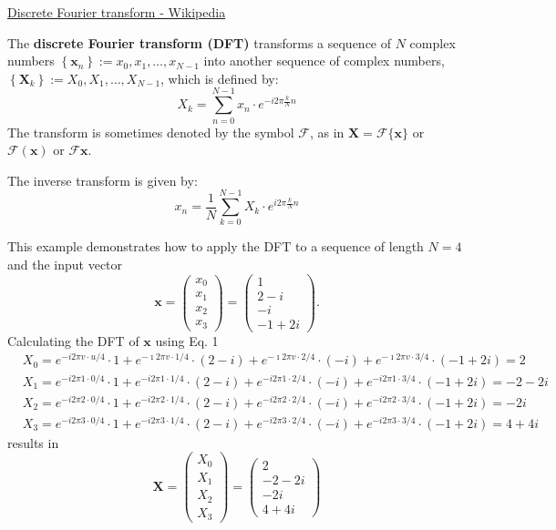
\href{https://en.wikipedia.org/wiki/Discrete_Fourier_transform}{Discrete Fourier transform - Wikipedia}

\begin{definition}
The \textbf{discrete Fourier transform (DFT)} transforms a sequence of $N$ complex numbers $\left\{\mathbf{x}_n\right\}:=x_0, x_1, \ldots, x_{N-1}$ into another sequence of complex numbers, $\left\{\mathbf{X}_k\right\}:=X_0, X_1, \ldots, X_{N-1}$, which is defined by:
$$
X_k=\sum_{n=0}^{N-1} x_n \cdot e^{-i 2 \pi \frac{k}{N} n}
$$
The transform is sometimes denoted by the symbol $\mathcal{F}$, as in $\mathbf{X}=\mathcal{F}\{\mathbf{x}\}$ or $\mathcal{F}(\mathbf{x})$ or $\mathcal{F} \mathbf{x}$.
\end{definition}

The inverse transform is given by:
$$
x_n=\frac{1}{N} \sum_{k=0}^{N-1} X_k \cdot e^{i 2 \pi \frac{k}{N} n}
$$

\begin{example}
    This example demonstrates how to apply the DFT to a sequence of length $N=4$ and the input vector
$$
\mathbf{x}=\left(\begin{array}{l}
x_0 \\
x_1 \\
x_2 \\
x_3
\end{array}\right)=\left(\begin{array}{c}
1 \\
2-i \\
-i \\
-1+2 i
\end{array}\right) .
$$
Calculating the DFT of $\mathbf{x}$ using Eq. 1
$$
\begin{aligned}
& X_0=e^{-i 2 \pi v \cdot u / 4} \cdot 1+e^{-\imath 2 \pi v \cdot 1 / 4} \cdot(2-i)+e^{-\imath 2 \pi v \cdot 2 / 4} \cdot(-i)+e^{-\imath 2 \pi v \cdot 3 / 4} \cdot(-1+2 i)=2 \\
& X_1=e^{-i 2 \pi 1 \cdot 0 / 4} \cdot 1+e^{-i 2 \pi 1 \cdot 1 / 4} \cdot(2-i)+e^{-i 2 \pi 1 \cdot 2 / 4} \cdot(-i)+e^{-i 2 \pi 1 \cdot 3 / 4} \cdot(-1+2 i)=-2-2 i \\
& X_2=e^{-i 2 \pi 2 \cdot 0 / 4} \cdot 1+e^{-i 2 \pi 2 \cdot 1 / 4} \cdot(2-i)+e^{-i 2 \pi 2 \cdot 2 / 4} \cdot(-i)+e^{-i 2 \pi 2 \cdot 3 / 4} \cdot(-1+2 i)=-2 i \\
& X_3=e^{-i 2 \pi 3 \cdot 0 / 4} \cdot 1+e^{-i 2 \pi 3 \cdot 1 / 4} \cdot(2-i)+e^{-i 2 \pi 3 \cdot 2 / 4} \cdot(-i)+e^{-i 2 \pi 3 \cdot 3 / 4} \cdot(-1+2 i)=4+4 i
\end{aligned}
$$
results in
$$
\mathbf{X}=\left(\begin{array}{c}
X_0 \\
X_1 \\
X_2 \\
X_3
\end{array}\right)=\left(\begin{array}{c}
2 \\
-2-2 i \\
-2 i \\
4+4 i
\end{array}\right)
$$
\end{example}



